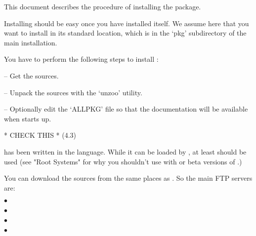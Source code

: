 

This document describes the procedure of installing the package.

Installing {\Unipot} should  be  easy  once  you  have  installed  {\GAP}
itself. We assume here that you want to install {\Unipot} in its standard
location,  which  is  in  the  `pkg'  subdirectory  of the  main  {}
installation.


\null

You have to perform the following steps to install {\Unipot}:

\beginlist%
\item{--} Get the sources.
\item{--} Unpack the sources with the `unzoo' utility.
\item{--} Optionally edit the `ALLPKG' file so that the {\Unipot}
     documentation will be available when {\GAP} starts up.
\endlist                                                                                                      


\null

* CHECK THIS * (4.3)

{\Unipot} has been written in the {} language. While  it  can
be loaded by {}, at least {} should be used (see "Root
Systems" for why you shouldn't use {\Unipot} with {} or beta
versions of {}.)


You can download the sources  from the same places as {\GAP}. So the main
FTP servers are:

\beginlist%
\item{$\bullet$}
\item{$\bullet$}
\item{$\bullet$}
\item{$\bullet$}
\endlist

